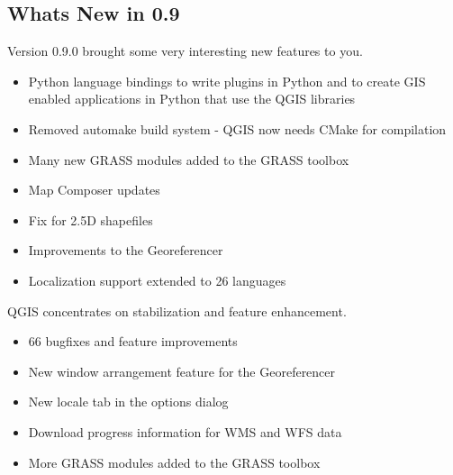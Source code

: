 \subsection{Whats New in 0.9}\label{label_whatsnew}

Version 0.9.0 brought some very interesting new features to you.

\begin{itemize}
\item Python language bindings to write plugins in Python and to create GIS 
enabled applications in Python that use the QGIS libraries
\item Removed automake build system - QGIS now needs CMake for compilation
\item Many new GRASS modules added to the GRASS toolbox
\item Map Composer updates
\item Fix for 2.5D shapefiles
\item Improvements to the Georeferencer
\item Localization support extended to 26 languages    
\end{itemize}

QGIS \CURRENT concentrates on stabilization and feature enhancement.

\begin{itemize}
\item 66 bugfixes and feature improvements 
\item New window arrangement feature for the Georeferencer
\item New locale tab in the options dialog
\item Download progress information for WMS and WFS data
\item More GRASS modules added to the GRASS toolbox
\end{itemize}
